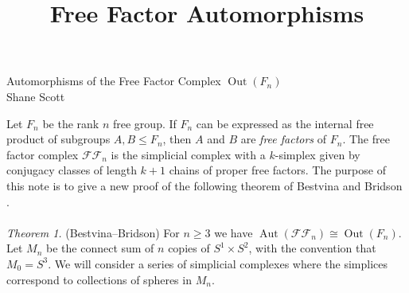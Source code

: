 \documentclass[11pt]{article}
\title{Free Factor Automorphisms}
\newcommand{\Aut}[1]{\ensuremath{ \aaut \left (#1 \right ) }}
\newcommand{\outn}{{\ensuremath{ \oout(F_n)}} }
\newcommand{\ffn}{{\ensuremath{ \mathcal {FF}_n }}}
\DeclareMathOperator{\oout}{Out}
\DeclareMathOperator{\aaut}{Aut}
\begin{document}
\begin{center}
{Automorphisms of the Free Factor Complex \outn}\\
Shane Scott
\end{center}

Let $F_n$ be the rank $n$ free group.
If $F_n$ can be expressed as the internal free product of subgroups $A,B \leqslant F_n$, then $A$ and $B$ are \emph{free factors} of $F_n$.
The free factor complex $\mathcal {FF}_n$ is the simplicial complex with a $k$-simplex given by conjugacy classes of length $k+1$ chains of proper free factors.
The purpose of this note is to give a new proof of the following theorem of Bestvina and Bridson \cite{bridson}.\\
\\
\noindent \emph{Theorem 1.} (Bestvina--Bridson) For $n \geq 3$ we have $\Aut{\ffn} \cong \outn$.\\

Let $M_{n}$ be the connect sum of $n$ copies of  $S^1 \times S^2$, with the convention that $M_0 =S^3$.
We will consider a series of simplicial complexes where the simplices correspond to collections of spheres in 
$M_n$.
\end{document}
